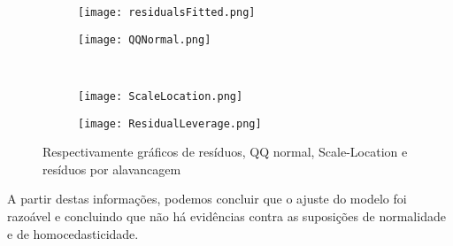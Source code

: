 \documentclass[10pt,a4paper]{article}
\begin{document}
\begin{figure}[ht]
    \centering
    \hspace*{-2.7cm}\begin{subfigure}{0.5\textwidth}
      \centering
      \texttt{[image: residualsFitted.png]}
    \end{subfigure}%
    \hspace*{3cm}\begin{subfigure}{0.5\textwidth}
      \centering
      \texttt{[image: QQNormal.png]}
    \end{subfigure}\\
    \hspace*{-2.7cm}\begin{subfigure}{0.5\textwidth}
      \centering
      \texttt{[image: ScaleLocation.png]}
    \end{subfigure}%
    \hspace*{3cm}\begin{subfigure}{0.5\textwidth}
      \centering
      \texttt{[image: ResidualLeverage.png]}
    \end{subfigure}
    \caption{Respectivamente gráficos de resíduos, QQ normal, Scale-Location e resíduos por alavancagem}
\end{figure}

A partir destas informações, podemos concluir que o ajuste do modelo foi razoável e concluindo que não há evidências contra as suposições de normalidade e de homocedasticidade.
\end{document}
